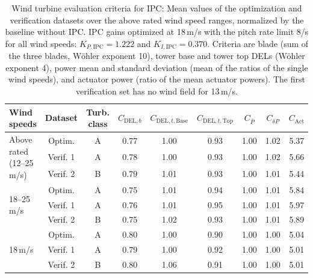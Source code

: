 \begin{table}[h]
    \centering
    \caption[Wind turbine evaluation criteria for IPC: Mean values of the optimization and verification datasets over the above rated wind speeds]{\label{tab:IPC_summary} Wind turbine evaluation criteria for IPC: Mean values of the optimization and verification datasets over the above rated wind speed ranges, normalized by the baseline without IPC. IPC gains optimized at 18\,m/s with the pitch rate limit 8\textdegree/s for all wind speeds: $K_{P,\text{IPC}} = 1.222$ and $K_{I,\text{IPC}} = 0.370$. Criteria are blade (sum of the three blades, W\"ohler exponent 10), tower base and tower top DELs (W\"ohler exponent 4), power mean and standard deviation (mean of the ratios of the single wind speeds), and actuator power (ratio of the mean actuator powers). The first verification set has no wind field for 13\,m/s.}
    \begin{tabular}{@{}l*{8}{c}@{}}
        \toprule
        Wind speeds & Dataset & Turb. class & $C_{\text{DEL},b}$ & $C_{\text{DEL},t,\text{Base}}$ & $C_{\text{DEL},t,\text{Top}}$ & $C_{\bar{P}}$ & $C_{\delta P}$ & $C_{\text{Act}}$ \\
        \midrule
        \multirow{3}{*}{Above rated (12--25\,m/s)} & Optim. & A & 0.77 & 1.00 & 0.93 & 1.00 & 1.02 & 5.37 \\
         & Verif. 1 & A & 0.78 & 1.00 & 0.93 & 1.00 & 1.02 & 5.66 \\
         & Verif. 2 & B & 0.79 & 1.01 & 0.93 & 1.00 & 1.01 & 5.44 \\
        \midrule
        \multirow{3}{*}{18--25\,m/s} & Optim. & A & 0.75 & 1.01 & 0.94 & 1.00 & 1.01 & 5.84 \\
         & Verif. 1 & A & 0.76 & 1.01 & 0.95 & 1.00 & 1.01 & 5.97 \\
         & Verif. 2 & B & 0.75 & 1.02 & 0.93 & 1.00 & 1.01 & 5.89 \\
        \midrule
        \multirow{3}{*}{18\,m/s} & Optim. & A & 0.80 & 1.00 & 0.90 & 1.00 & 1.00 & 5.04 \\
         & Verif. 1 & A & 0.79 & 1.00 & 0.92 & 1.00 & 1.00 & 5.01 \\
         & Verif. 2 & B & 0.80 & 1.06 & 0.91 & 1.00 & 1.00 & 5.01 \\
        \bottomrule
    \end{tabular}
\end{table}
